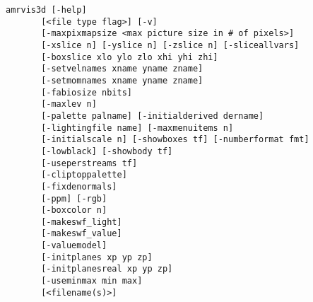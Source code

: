 \documentclass{article}
\begin{document}
\begin{verbatim}
amrvis3d [-help]
       [<file type flag>] [-v]
       [-maxpixmapsize <max picture size in # of pixels>]
       [-xslice n] [-yslice n] [-zslice n] [-sliceallvars]
       [-boxslice xlo ylo zlo xhi yhi zhi]
       [-setvelnames xname yname zname]
       [-setmomnames xname yname zname]
       [-fabiosize nbits]
       [-maxlev n]
       [-palette palname] [-initialderived dername]
       [-lightingfile name] [-maxmenuitems n]
       [-initialscale n] [-showboxes tf] [-numberformat fmt]
       [-lowblack] [-showbody tf]
       [-useperstreams tf]
       [-cliptoppalette]
       [-fixdenormals]
       [-ppm] [-rgb]
       [-boxcolor n]
       [-makeswf_light]
       [-makeswf_value]
       [-valuemodel]
       [-initplanes xp yp zp]
       [-initplanesreal xp yp zp]
       [-useminmax min max]
       [<filename(s)>]


\end{verbatim}
\end{document}
